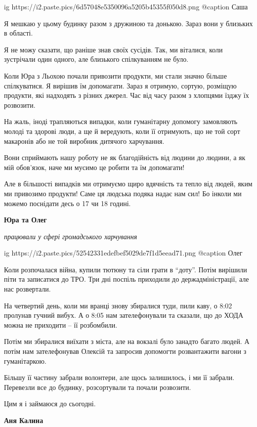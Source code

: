 \begin{multicols}{3}
\ifcmt
  ig https://i2.paste.pics/6d57048e5350096a5205b45355f050d8.png
	@caption Саша
\fi

Я мешкаю у цьому будинку разом з дружиною та донькою. Зараз вони у близьких в
області.

Я не можу сказати, що раніше знав своїх сусідів. Так, ми віталися, коли
зустрічали один одного, але близького спілкуванням не було.

Коли Юра з Льохою почали привозити продукти, ми стали значно більше
спілкуватися. Я вирішив їм допомагати. Зараз я отримую, сортую, розміщую
продукти, які надходять з різних  джерел. Час від часу разом з хлопцями їзджу
їх розвозити.

На жаль, іноді трапляються випадки, коли гуманітарну допомогу замовляють молоді
та здорові люди, а ще й вередують, коли її отримують, що не той сорт макаронів
або не  той виробник дитячого харчування.

Вони сприймають нашу роботу не як благодійність від людини до людини, а як мій
обов'язок, наче ми мусимо це робити та їм допомагати!

Але в більшості випадків ми отримуємо щиро вдячність та тепло від людей, яким
ми привозимо продукти! Саме ця людська подяка надає нам сил! Бо інколи ми
можемо поснідати десь о 17 чи 18 годині.

\textbf{Юра та Олег}

\emph{працювали у сфері громадського харчування}

\ifcmt
  ig https://i2.paste.pics/52542331edefbef5029de7f1d5eead71.png
	@caption Олег
\fi

Коли розпочалася війна, купили тютюну та сіли грати в \enquote{доту}. Потім вирішили
піти та записатися до ТРО. Три дні поспіль приходили до держадміністрації, але
нас розвертали.

На четвертий день, коли ми вранці знову збиралися туди, пили каву, о 8:02
пролунав гучний вибух. А о 8:05 нам зателефонували та сказали, що до ХОДА можна
не приходити – її розбомбили.

Потім ми збиралися виїхати з міста, але на вокзалі було занадто багато людей. А
потім нам зателефонував Олексій та запросив допомогти розвантажити вагони з
гуманітаркою.

Більшу її частину забрали волонтери, але щось залишилось, і ми її забрали.
Перевезли все до будинку, розсортували та почали розвозити.

Цим я і займаюся до сьогодні.

\textbf{Аня Калина}


\end{multicols}
